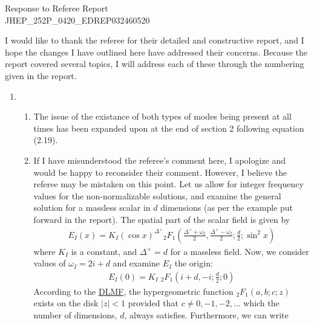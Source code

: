 \documentclass[11pt,letterpaper]{article}
\begin{document}
\vspace{.2in}
\begin{center}
    {\Large Response to Referee Report \\ JHEP\_252P\_0420\_EDREP032460520}  
\end{center}

\vspace{.25in}

I would like to thank the referee for their detailed and constructive
report, and I hope the changes I have outlined here have addressed their
concerns. Because the report covered several topics, I will address each
of these through the numbering given in the report.
\begin{enumerate}
    \item
    \begin{enumerate}
        \item The issue of the existance of both types of modes being
        present at all times has been expanded upon at the end of section 2 
        following equation (2.19).
        \item If I have misunderstood the referee's comment here, I apologize and would be 
        happy to reconsider their comment. However, I believe the referee may be mistaken on this
        point. Let us allow for integer frequency values for the non-normalizable solutions,
        and examine the general solution for a massless scalar in $d$ dimensions (as 
        per the example put forward in the report). The spatial part of the scalar field
        is given by
        \begin{align}
            \label{e:NN function}
            E_I (x) = K_I \left( \cos x \right)^{\Delta^+} {_2}F_1 \left(\frac{\Delta^+ + \omega_I}{2}, \frac{\Delta^+ - \omega_I}{2}; \frac{d}{2}; \sin^2 x \right)
        \end{align}
        where $K_I$ is a constant, and $\Delta^+ = d$ for a massless field. Now, we
        consider values of $\omega_I = 2i + d$ and examine $E_I$ the origin:
        \begin{align}
            E_I(0) = K_I \; {_2}F_1 \left( i + d, -i; \frac{d}{2}; 0 \right)
        \end{align}
        According to the \href{https://dlmf.nist.gov/15.2}{DLMF}, the hypergeometric function
        ${_2}F_1 (a, b; c; z)$ exists on the disk $| z | < 1$ provided that $c \neq 0, -1, -2, \ldots$
        which the number of dimensions, $d$, always satisfies. Furthermore, we can write
        \begin{align}

\end{align}
\end{enumerate}
\end{enumerate}
\end{document}
